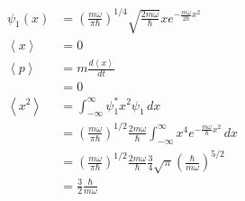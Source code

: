 \documentclass{article}
\newcommand{\ev}[1]{\left< #1 \right>}
\begin{document}
\begin{enumerate}
        \begin{align*}
          \psi_1(x) & = \left( \frac{m \omega}{\pi \hbar} \right)^{1 / 4} \sqrt{\frac{2 m \omega}{\hbar}} x e^{-\frac{m \omega}{2 \hbar} x^2}                                                                                                                                                             \\
          \ev{x}    & = 0                                                                                                                                                                                                                                                                                 \\
          \ev{p}    & = m \frac{d \ev{x}}{d t}                                                                                                                                                                                                                                                            \\
                    & = 0                                                                                                                                                                                                                                                                                 \\
          \ev{x^2}  & = \int_{-\infty}^\infty \psi_1^* x^2 \psi_1 \,d x                                                                                                                                                                                                                                   \\
                    & = \left( \frac{m \omega}{\pi \hbar} \right)^{1 / 2} \frac{2 m \omega}{\hbar} \int_{-\infty}^\infty x^4 e^{-\frac{m \omega}{\hbar} x^2} \,d x                                                                                                                                        \\
                    & = \left( \frac{m \omega}{\pi \hbar} \right)^{1 / 2} \frac{2 m \omega}{\hbar} \frac{3}{4} \sqrt{\pi} \left( \frac{\hbar}{m \omega} \right)^{5 / 2}                                                                                                                                   \\
                    & = \frac{3}{2} \frac{\hbar}{m \omega}                                                                                                                                                                                                                                                \\

\end{align*}
\end{enumerate}
\end{document}
